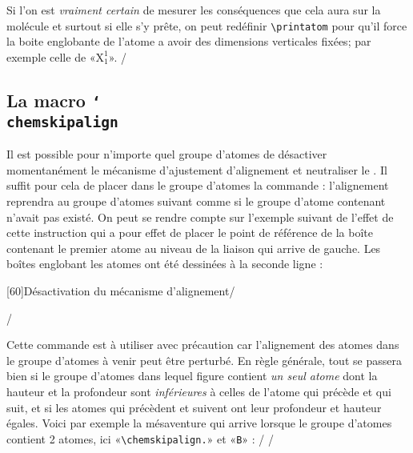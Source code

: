 \documentclass[10pt,french]{article}
\makeatletter
\newcommand\make@car@active[1]{%
	\catcode`#1\active
	\begingroup
		\lccode`\~`#1\relax
		\lowercase{\endgroup\def~}%
}
\newif\if@exstar
\newcommand\exemple{%
	\begingroup
	\parskip\z@
	\@makeother\;\@makeother\!\@makeother\?\@makeother\:%
	\@ifstar{\@exstartrue\exemple@}{\@exstarfalse\exemple@}}
\newcommand\exemple@[2][65]{%
	\medbreak\noindent
	\begingroup
		\let\do\@makeother\dospecials
		\make@car@active\ { {}}%
		\make@car@active\^^M{\par\leavevmode}%
		\make@car@active\^^I{\space\space}%
		\make@car@active\,{\leavevmode\kern\z@\string,}%
		\make@car@active\-{\leavevmode\kern\z@\string-}%
		\make@car@active\>{\leavevmode\kern\z@\string>}%
		\make@car@active\<{\leavevmode\kern\z@\string<}%
		\exemple@@{#1}{#2}%
}
\newcommand\exemple@@[3]{%
	\def\@tempa##1#3{\exemple@@@{#1}{#2}{##1}}%
	\@tempa
}
\newcommand\exemple@@@[3]{%
	\xdef\the@code{#3}%
	\endgroup
	\if@exstar
		\begingroup
			\fboxrule0.4pt
			\let\breakboxparindent\z@
			\def\bkvz@bottom{\hrule\@height\fboxrule}%
			\let\bkvz@before@breakbox\relax
			\def\bkvz@set@linewidth{\advance\linewidth\dimexpr-2\fboxrule-2\fboxsep}%
			\def\bkvz@left{\vrule\@width\fboxrule\hskip\fboxsep}%
			\def\bkvz@right{\hskip\fboxsep\vrule\@width\fboxrule}%
			\def\bkvz@top{\hbox to \hsize{%
				\vrule\@width\fboxrule\@height\fboxrule
				\leaders\bkvz@bottom\hfill
				\sffamily
				\fboxsep\z@
				\colorbox{black}{\kern0.25em\color{white}\footnotesize\lower0.5ex\hbox{\strut#2}\kern0.25em}%
				\leaders\bkvz@bottom\hfill
				\vrule\@width\fboxrule\@height\fboxrule}}%
			\breakbox
				\kern.5ex\relax
				\ttfamily\footnotesize\the@code\par
				\normalfont
				\kern3pt
				\hrule height0.1pt width\linewidth depth0.1pt
				\vskip5pt
				\rightskip0pt plus 1fill
				\everypar{{\color{lightgray}\rlap{\vrule height0.1pt width\linewidth depth0.1pt}}\hskip0pt plus 1fill}%
				\newlinechar`\^^M\everyeof{\noexpand}\scantokens{#3}\par
			\endbreakbox
		\endgroup
	\else
		\vskip0.5ex
		\boxput*(0,1)
			{\fboxsep\z@
			\hbox{\sffamily\colorbox{black}{\leavevmode\kern0.25em{\color{white}\footnotesize\strut#2}\kern0.25em}}%
			}%
			{\fboxsep5pt
			\fbox{%
				$\vcenter{\hsize\dimexpr0.#1\linewidth-\fboxsep-\fboxrule\relax
					\kern5pt\parskip0pt \ttfamily\footnotesize\the@code}%
				\vcenter{\kern5pt\hsize\dimexpr\linewidth-0.#1\linewidth-\fboxsep-\fboxrule\relax
					\everypar{{\color{lightgray}\rlap{\vrule height0.1pt width\dimexpr\linewidth-0.#1\linewidth-\fboxsep-\fboxrule depth0.1pt}}}%
					\footnotesize\newlinechar`\^^M\everyeof{\noexpand}\scantokens{#3}}$%
				}%
			}%
	\fi
	\medbreak
	\endgroup
}
\newcommand\falseverb[1]{{\ttfamily\detokenize\expandafter{\string#1}}}
\makeatother
\begin{document}
Si l'on est \emph{vraiment certain} de mesurer les conséquences que cela aura sur la molécule et surtout si elle s'y prête, on peut redéfinir \verb|\printatom| pour qu'il force la boite englobante de l'atome a avoir des dimensions verticales fixées; par exemple celle de «$\mathrm{X^1_1}$».
\exemple*{Redéfinition de \string\printatom}/\Huge\setchemfig{atom sep=2em}
\let\oldprintatom\printatom
\renewcommand\printatom[1]{%
	\begingroup
		\setbox0\hbox{\oldprintatom{X^1_1}}%
		\edef\tmp{\ht0=\the\ht0\relax\dp0=\the\dp0\box0 }%
		\setbox0\hbox{\oldprintatom{#1}}%
		\ifnum1\ifdim\ht0=0pt0\fi\ifdim\dp0=0pt0\fi\ifdim\wd0=0pt0\fi<1000
			\tmp
		\fi
	\endgroup
}
\qquad
{}/

\subsection{La macro \texttt{\char`\\chemskipalign}}\label{chemskipalign}
Il est possible pour n'importe quel groupe d'atomes de désactiver momentanément le mécanisme d'ajustement d'alignement et neutraliser le \falseverb\vphantom. Il suffit pour cela de placer dans le groupe d'atomes la commande \falseverb{\chemskipalign} : l'alignement reprendra au groupe d'atomes suivant comme si le groupe d'atome contenant \falseverb{\chemskipalign} n'avait pas existé. On peut se rendre compte sur l'exemple suivant de l'effet de cette instruction qui a pour effet de placer le point de référence de la boîte contenant le premier atome au niveau de la liaison qui arrive de gauche. Les boîtes englobant les atomes ont été dessinées à la seconde ligne :

\exemple[60]{Désactivation du mécanisme d'alignement}/\large
{}\quad
{}\par\bigskip
\fboxsep=0pt
\renewcommand\printatom[1]{\fbox{\ensuremath{\mathrm{#1}}}}
\quad
{}/

Cette commande est à utiliser avec précaution car l'alignement des atomes dans le groupe d'atomes à venir peut être perturbé. En règle générale, tout se passera bien si le groupe d'atomes dans lequel figure \falseverb{\chemskipalign} contient \emph{un seul atome} dont la hauteur et la profondeur sont \emph{inférieures} à celles de l'atome qui précède et qui suit, et si les atomes qui précèdent et suivent ont leur profondeur et hauteur égales. Voici par exemple la mésaventure qui arrive lorsque le groupe d'atomes contient 2 atomes, ici «\verb-\chemskipalign.-» et «\verb-B-» :
\exemple{Conséquence de la commande \string\chemskipalign}/\large
\fboxsep=0pt
\renewcommand\printatom[1]{\fbox{\ensuremath{\mathrm{#1}}}}
/
\end{document}
